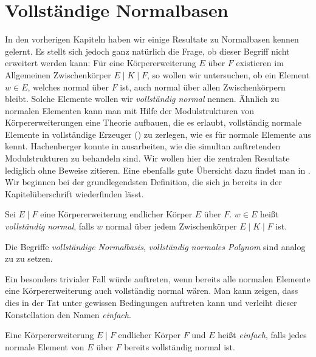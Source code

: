 \chapter{Vollständige Normalbasen}
\label{chap:vollst_normalbasen}

In den vorherigen Kapiteln haben wir einige Resultate zu Normalbasen kennen
gelernt. Es stellt sich jedoch ganz natürlich die Frage, ob dieser Begriff
nicht erweitert werden kann: Für eine Körpererweiterung $E$ über $F$ existieren
im Allgemeinen Zwischenkörper $E \mid K \mid F$, so wollen wir untersuchen,
ob ein Element $w \in E$, welches normal über $F$ ist, auch normal über allen
Zwischenkörpern bleibt. Solche Elemente wollen wir \emph{vollständig normal}
nennen. Ähnlich zu normalen Elementen kann man mit Hilfe der Modulstrukturen
von Körpererweiterungen eine Theorie aufbauen, die es erlaubt, vollständig
normale Elemente in vollständige Erzeuger () zu
zerlegen, wie es für normale Elemente aus 
kennt. Hachenberger konnte in \autocite{hachenberger1997finite} ausarbeiten, wie
die simultan auftretenden Modulstrukturen zu behandeln sind. Wir wollen hier
die zentralen Resultate lediglich ohne Beweise zitieren. Eine ebenfalls gute
Übersicht dazu findet man in \autocite[Section 5.4]{mullen2013handbook}.
Wir beginnen bei der grundlegendsten Definition, die sich ja bereits in der
Kapitelüberschrift wiederfinden lässt.

\begin{definition}
  Sei $E \mid F$ eine Körpererweiterung endlicher Körper $E$ über $F$.
  $w\in E$ heißt \emph{vollständig normal}, falls $w$ normal über jedem
  Zwischenkörper $E \mid K\mid F$ ist.

  Die Begriffe \emph{vollständige Normalbasis}, \emph{vollständig normales
  Polynom} sind analog zu  zu setzen.
\end{definition}

Ein besonders trivialer Fall würde auftreten, wenn bereits alle normalen
Elemente eine Körpererweiterung auch vollständig normal wären. Man kann zeigen,
dass dies in der Tat unter gewissen Bedingungen auftreten kann und verleiht
dieser Konstellation den Namen \emph{einfach}.

\begin{definition}[einfach]
  \label{def:einfach}
  Eine Körpererweiterung $E \mid F$ endlicher Körper $F$ und $E$ heißt 
  \emph{einfach}, falls jedes normale Element von $E$ über $F$ bereits
  vollständig normal ist.
\end{definition}


